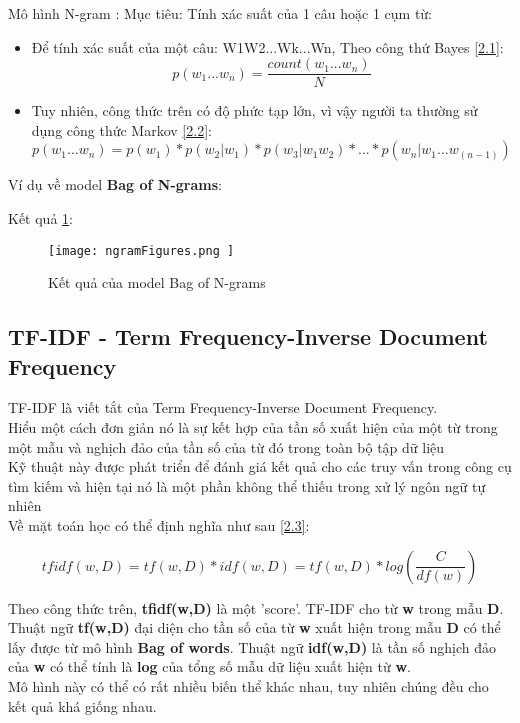 Mô hình N-gram \cite{NGRAM}:
Mục tiêu: Tính xác suất của 1 câu hoặc 1 cụm từ:
\begin{itemize}
	\item Để tính xác suất của một câu: W1W2...Wk...Wn, Theo công thứ Bayes \cite{NGRAM} \ref{2.1}:
	\begin{equation}
		p(w_1...w_n) = \frac{count(w_1...w_n)}{N} \label{2.1} 
	\end{equation}
	
	\item Tuy nhiên, công thức trên có độ phức tạp lớn, vì vậy người ta thường sử dụng công thức Markov \cite{NGRAM} \ref{2.2}:
	\begin{equation}
		p(w_1...w_n) = p(w_1) * p(w_2|w_1) * p(w_3|w_1w_2)  *...*p(w_n|w_1...w_(n-1)) \label{2.2} 
	\end{equation}
\end{itemize}

Ví dụ về model \textbf{Bag of N-grams}:



Kết quả \ref{pic2.3}: 
\begin{figure}[h!]
	\centering
	\texttt{[image: 
			ngramFigures.png
		]}
	\caption[Kết quả của model Bag of N-grams]{
			Kết quả của model Bag of N-grams  \cite{WEBSITE:11} \label{pic2.3}
		}
\end{figure}

\subsection{TF-IDF - Term Frequency-Inverse Document Frequency}
TF-IDF là viết tắt của Term Frequency-Inverse Document Frequency.\\
Hiểu một cách đơn giản nó là sự kết hợp của tần số xuất hiện của một từ trong một mẫu và nghịch đảo của tần số của từ đó trong toàn bộ tập dữ liệu\\
Kỹ thuật này được phát triển để đánh giá kết quả cho các truy vấn trong công cụ tìm kiếm và hiện tại nó là một phần không thể thiếu trong xử lý ngôn ngữ tự nhiên \cite{WEBSITE:11}\\
Về mặt toán học có thể định nghĩa như sau \cite{WEBSITE:10} \ref{2.3}:

\begin{equation}
	tfidf(w,D) = tf(w,D)*idf(w,D)=tf(w,D)*log(\frac{C}{df(w)}) \label{2.3}
\end{equation}

Theo công thức trên, \textbf{tfidf(w,D)} là một 'score'. TF-IDF cho từ \textbf{w} trong mẫu \textbf{D}. Thuật ngữ \textbf{tf(w,D)} đại diện cho tần số của từ \textbf{w} xuất hiện trong mẫu \textbf{D} có thể lấy được từ mô hình \textbf{Bag of words}. Thuật ngữ \textbf{idf(w,D)} là tần số nghịch đảo của \textbf{w} có thể tính là \textbf{log} của tổng số mẫu dữ liệu xuất hiện từ \textbf{w}. \\
Mô hình này có thể có rất nhiều biến thể khác nhau, tuy nhiên chúng đều cho kết quả khá giống nhau. 

